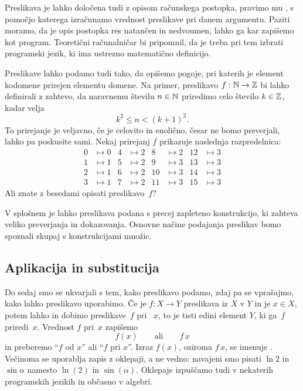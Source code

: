Preslikava je lahko določena tudi z opisom računskega postopka, pravimo mu ,
s pomočjo katerega izračunamo vrednost preslikave pri danem argumentu. Paziti moramo, da je
opis postopka res natančen in nedvoumen, lahko ga kar zapišemo kot program. Teoretični
računalničar bi pripomnil, da je treba pri tem izbrati programski jezik, ki ima ustrezno
matematično definicijo.

Preslikave lahko podamo tudi tako, da opišemo pogoje, pri katerih je element kodomene
prirejen elementu domene. Na primer, preslikavo $f : \mathbb{N} \to \mathbb{Z}$ bi lahko definirali z
zahtevo, da naravnemu številu $n \in \mathbb{N}$ priredimo celo število $k \in \mathbb{Z}$, kadar velja
%
\begin{equation*}
  k^2 \leq n < (k+1)^2.
\end{equation*}
%
To prirejanje je veljavno, če je celovito in enolično, česar ne bomo preverjali, lahko pa
poskusite sami. Nekaj prirejanj $f$ prikazuje naslednja razpredelnica:
%
\begin{align*}
0 &\mapsto 0   &   4 &\mapsto 2   &    8  &\mapsto 2   &   12 &\mapsto 3 \\
1 &\mapsto 1   &   5 &\mapsto 2   &    9  &\mapsto 3   &   13 &\mapsto 3 \\
2 &\mapsto 1   &   6 &\mapsto 2   &    10 &\mapsto 3   &   14 &\mapsto 3 \\
3 &\mapsto 1   &   7 &\mapsto 2   &    11 &\mapsto 3   &   15 &\mapsto 3
\end{align*}
%
Ali znate z besedami opisati preslikavo~$f$?

V splošnem je lahko preslikava podana s precej zapleteno konstrukcijo, ki zahteva veliko
preverjanja in dokazovanja. Osnovne načine podajanja preslikav bomo spoznali skupaj s
konstrukcijami množic.


\subsection{Aplikacija in substitucija}
\label{sec:aplikacija-in-subsitucija}

Do sedaj smo se ukvarjali s tem, kako preslikavo podamo, zdaj pa se vprašajmo, kako lahko
preslikavo uporabimo. Če je $f : X \to Y$ preslikava iz $X$ v $Y$ in je $x \in X$, potem
lahko  in dobimo  preslikave~$f$ pri
~$x$, to je tisti edini element $Y$, ki ga~$f$ priredi~$x$. Vrednost $f$
pri~$x$ zapišemo
%
\begin{equation*}
  f(x)
  \qquad\text{ali}\qquad
  f\,x
\end{equation*}
%
in preberemo ``$f$ od $x$'' ali ``$f$ pri $x$''. Izraz $f(x)$, oziroma $f\,x$, se imenuje
. Večinoma se uporablja zapis z oklepaji, a ne vedno: navajeni smo pisati
$\ln 2$ in $\sin \alpha$ namesto $\ln(2)$ in $\sin(\alpha)$. Oklepaje izpuščamo tudi v
nekaterih programskih jezikih in občasno v algebri.

